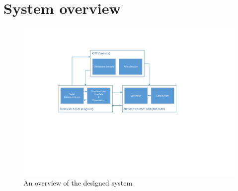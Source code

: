 \documentclass[11pt,titlepage]{report}
\begin{document}
\chapter{System overview}

\begin{figure}[H]
	\centering
	\includegraphics[width=\linewidth]{resource/system-overview.pdf}
	\caption{An overview of the designed system}
	\label{fig:system-overview}
\end{figure}
\end{document}
